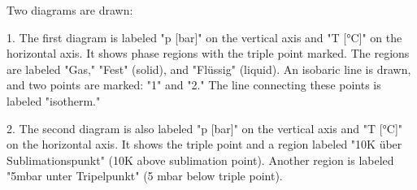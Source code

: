 Two diagrams are drawn:  

1. The first diagram is labeled "p [bar]" on the vertical axis and "T [°C]" on the horizontal axis. It shows phase regions with the triple point marked. The regions are labeled "Gas," "Fest" (solid), and "Flüssig" (liquid). An isobaric line is drawn, and two points are marked: "1" and "2." The line connecting these points is labeled "isotherm."  

2. The second diagram is also labeled "p [bar]" on the vertical axis and "T [°C]" on the horizontal axis. It shows the triple point and a region labeled "10K über Sublimationspunkt" (10K above sublimation point). Another region is labeled "5mbar unter Tripelpunkt" (5 mbar below triple point).